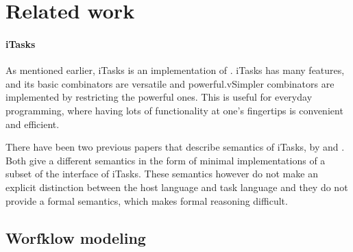 


\section{Related work}
\label{sec:relatedwork}



\paragraph{iTasks}

As mentioned earlier, iTasks is an implementation of \TOP. iTasks has many
features, and its basic combinators are versatile and powerful.vSimpler
combinators are implemented by restricting the powerful ones. This is useful for
everyday programming, where having lots of functionality at one's fingertips is
convenient and efficient.

There have been two previous papers that describe semantics of iTasks, by
\citet{conf/ifl/KoopmanPA08} and \citet{conf/ppdp/PlasmeijerLMAK12}.
Both give a different semantics in the form of minimal implementations of a
subset of the interface of iTasks. These semantics however do not make an
explicit distinction between the host language and task language and they do not
provide a formal semantics, which makes formal reasoning difficult.





\subsection{Worfklow modeling}

